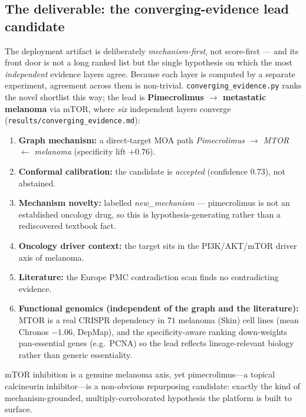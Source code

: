 \documentclass[11pt]{article}
\begin{document}
\subsection{The deliverable: the converging-evidence lead candidate}
\begin{sloppypar}
The deployment artifact is deliberately \emph{mechanism-first}, not score-first --- and its
front door is not a long ranked list but the single hypothesis on which the most
\emph{independent} evidence layers agree. Because each layer is computed by a separate
experiment, agreement across them is non-trivial. \texttt{converging\_evidence.py} ranks the
novel shortlist this way; the lead is \textbf{Pimecrolimus $\rightarrow$ metastatic melanoma}
via mTOR, where \emph{six} independent layers converge
(\texttt{results/converging\_evidence.md}):
\begin{enumerate}[leftmargin=1.4em,itemsep=0pt,topsep=2pt]
\item \textbf{Graph mechanism:} a direct-target MOA path
\textit{Pimecrolimus $\to$ MTOR $\leftarrow$ melanoma} (specificity lift $+0.76$).
\item \textbf{Conformal calibration:} the candidate is \emph{accepted} (confidence $0.73$), not abstained.
\item \textbf{Mechanism novelty:} labelled \emph{new\_mechanism} --- pimecrolimus is not an
established oncology drug, so this is hypothesis-generating rather than a rediscovered textbook fact.
\item \textbf{Oncology driver context:} the target sits in the PI3K/AKT/mTOR driver axis of melanoma.
\item \textbf{Literature:} the Europe PMC contradiction scan finds no contradicting evidence.
\item \textbf{Functional genomics (independent of the graph and the literature):} MTOR is a real
CRISPR dependency in $71$ melanoma (Skin) cell lines (mean Chronos $-1.06$, DepMap), and the
specificity-aware ranking down-weights pan-essential genes (e.g.\ PCNA) so the lead reflects
lineage-relevant biology rather than generic essentiality.
\end{enumerate}
mTOR inhibition is a genuine melanoma axis, yet pimecrolimus---a topical calcineurin
inhibitor---is a non-obvious repurposing candidate: exactly the kind of mechanism-grounded,
multiply-corroborated hypothesis the platform is built to surface.


\end{sloppypar}
\end{document}
